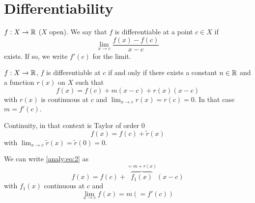 \documentclass[10pt, a4paper]{article}
\begin{document}
\newpage

\section{Differentiability}

\begin{definition}
    $f : X \rightarrow \mathbb{R}$
    ($X$ open).
    We say that $f$ is differentiable at a point $c \in X$ if
    \[
    \lim_{x \rightarrow c}\frac{f(x) - f(c)}{x - c}
    \]
    exists.
    If so,
    we write $f'(c)$ for the limit.
\end{definition}

\begin{lemma}\label{analy:lem:firstordertaylor}
    $f : X \rightarrow \mathbb{R}$,
    $f$ is differentiable at $c$ if and only if there exists a constant $n \in \mathbb{R}$ and a function $r(x)$ on $X$ such that
    \begin{equation}\label{analy:eq:2}
        f(x) = f(c) + m(x - c) + r(x)(x - c)
    \end{equation}
    with $r(x)$ is continuous at $c$ and $\lim_{x \rightarrow c} r(x) = r(c) = 0$.
    In that case $m = f'(c)$.
\end{lemma}

Continuity,
in that context is Taylor of order $0$
\[
f(x) = f(c) + \tilde{r}(x)
\]
with $\lim_{x \rightarrow c}\tilde{r}(x) = \tilde{r}(0) = 0$.

We can write \eqref{analy:eq:2} as
\[
f(x) = f(c) + \overbrace{f_1(x)}^{= m + r(x)}(x - c)
\]
with $f_1(x)$ continuous at $c$ and
\[
\lim_{x \rightarrow c}f(x) = m(= f'(c))
\]
\end{document}
